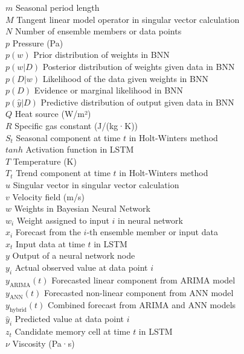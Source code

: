 \begin{tabbing}
$m$ \> Seasonal period length \\
$M$ \> Tangent linear model operator in singular vector calculation \\
$N$ \> Number of ensemble members or data points \\
$p$ \> Pressure (Pa) \\
$p(w)$ \> Prior distribution of weights in BNN \\
$p(w|D)$ \> Posterior distribution of weights given data in BNN \\
$p(D|w)$ \> Likelihood of the data given weights in BNN \\
$p(D)$ \> Evidence or marginal likelihood in BNN \\
$p(\hat{y}|D)$ \> Predictive distribution of output given data in BNN \\
$Q$ \> Heat source (W/m²) \\
$R$ \> Specific gas constant (J/(kg·K)) \\
$S_t$ \> Seasonal component at time $t$ in Holt-Winters method \\
$tanh$ \> Activation function in LSTM \\
$T$ \> Temperature (K) \\
$T_t$ \> Trend component at time $t$ in Holt-Winters method \\
$u$ \> Singular vector in singular vector calculation \\
$v$ \> Velocity field (m/s) \\
$w$ \> Weights in Bayesian Neural Network \\
$w_i$ \> Weight assigned to input $i$ in neural network \\
$x_i$ \> Forecast from the $i$-th ensemble member or input data \\
$x_t$ \> Input data at time $t$ in LSTM \\
$y$ \> Output of a neural network node \\
$y_i$ \> Actual observed value at data point $i$ \\
$y_{\text{ARIMA}}(t)$ \> Forecasted linear component from ARIMA model \\
$y_{\text{ANN}}(t)$ \> Forecasted non-linear component from ANN model \\
$y_{\text{hybrid}}(t)$ \> Combined forecast from ARIMA and ANN models \\
$\hat{y}_i$ \> Predicted value at data point $i$ \\
$z_t$ \> Candidate memory cell at time $t$ in LSTM \\
$\nu$ \> Viscosity (Pa·s) \\

\end{tabbing}
